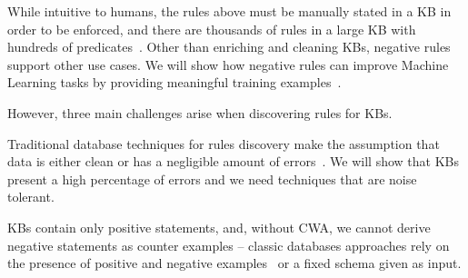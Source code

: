 While intuitive to humans, the rules above must be manually stated in a KB in order to be enforced, and there are thousands of rules in a large KB with hundreds of predicates~\cite{gc2015big}. Other than enriching and cleaning KBs, negative rules support other use cases. %
We will show how negative rules 
can improve Machine Learning tasks by providing meaningful training examples~\cite{richardson2006markov,shin2015incremental}.


\vspace{1mm}
However, %
three main challenges arise when discovering rules for KBs.

Traditional database techniques for rules discovery make the assumption that data is either clean or has a negligible amount of errors~\cite{abiteboul1995foundations,huhtala1999tane,wyss2001fastfds,chu2013discovering}. We will show that KBs present a high percentage of errors and we need techniques that are noise tolerant.

KBs contain only positive statements, and, without CWA, we cannot derive negative statements as counter examples --  classic databases approaches rely on the presence of positive and negative examples~\cite{dehaspe1999discovery,muggleton1994inductive} or a fixed schema given as input.  


